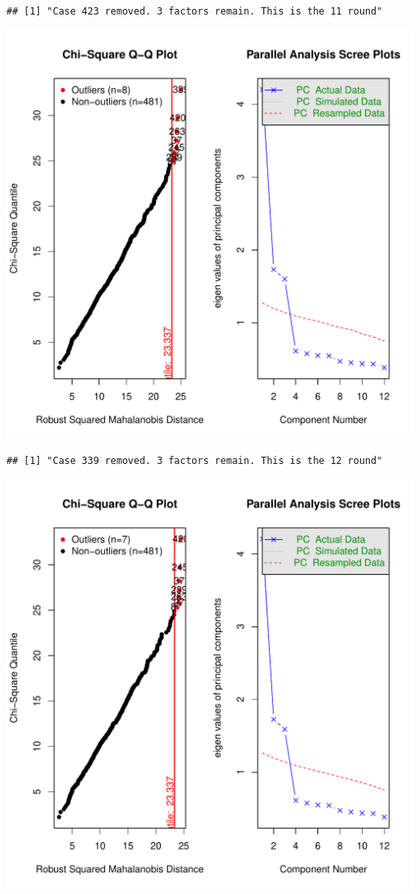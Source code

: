 \documentclass{article}\usepackage[]{graphicx}\usepackage[]{color}
\makeatletter
\def\maxwidth{ %
  \ifdim\Gin@nat@width>\linewidth
    \linewidth
  \else
    \Gin@nat@width
  \fi
}
\newenvironment{kframe}{%
 \def\at@end@of@kframe{}%
 \ifinner\ifhmode%
  \def\at@end@of@kframe{\end{minipage}}%
  \begin{minipage}{\columnwidth}%
 \fi\fi%
 \def\FrameCommand##1{\hskip\@totalleftmargin \hskip-\fboxsep
 \colorbox{shadecolor}{##1}\hskip-\fboxsep
     \hskip-\linewidth \hskip-\@totalleftmargin \hskip\columnwidth}%
 \MakeFramed {\advance\hsize-\width
   \@totalleftmargin\z@ \linewidth\hsize
   \@setminipage}}%
 {\par\unskip\endMakeFramed%
 \at@end@of@kframe}
\newenvironment{knitrout}{}{} %
\makeatother
\begin{document}
\begin{knitrout}
\begin{kframe}\begin{verbatim}
## [1] "Case 423 removed. 3 factors remain. This is the 11 round"
\end{verbatim}
\end{kframe}
\includegraphics[width=\maxwidth]{figure/unnamed-chunk-10-12} 
\begin{kframe}\begin{verbatim}
## [1] "Case 339 removed. 3 factors remain. This is the 12 round"
\end{verbatim}
\end{kframe}
\includegraphics[width=\maxwidth]{figure/unnamed-chunk-10-13} 

\end{knitrout}
\end{document}
